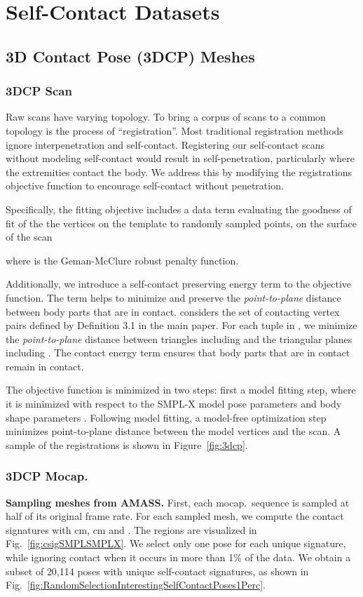 \documentclass[final]{cvpr}
\newcommand{\nummeshes}{20,114}
\theoremstyle{definition}
\begin{document}
\section{Self-Contact Datasets}
\label{sec-registration}
\subsection{3D Contact Pose (3DCP) Meshes}
\subsubsection{3DCP Scan} \label{subsec-3dcpscan}
Raw scans have varying topology.  To bring a corpus of scans to a common topology is the process of ``registration''.
Most traditional registration methods ignore interpenetration and self-contact.
Registering our self-contact scans without modeling self-contact would result in self-penetration, particularly where the extremities contact the body.
We address this by modifying the registrations objective function to encourage self-contact without penetration.

Specifically, the fitting objective includes a data term  evaluating the goodness of fit of the the vertices  on the template   to   randomly sampled points,  on the surface of the scan  

where  is the  Geman-McClure robust penalty function. 

Additionally, we introduce a  self-contact preserving energy term  to the objective function. The term  helps  to minimize and preserve the \emph{point-to-plane} distance between body parts that are in contact.  considers the set of contacting vertex pairs  defined by Definition 3.1 
in the main paper. For each tuple  in , we minimize the \emph{point-to-plane} distance between triangles including  and the triangular planes including  .  The contact energy term ensures that body parts that are in contact remain in contact. 

The objective function is minimized in two steps: first a model fitting step, where it is minimized with respect to the SMPL-X model pose parameters   and body shape parameters . Following model fitting, a model-free optimization step minimizes  point-to-plane distance between the model vertices  and the scan. 
A sample of the  registrations is shown in Figure~\ref{fig:3dcp}.
\subsubsection{3DCP Mocap.} 
\textbf{Sampling meshes from AMASS.} 
First, each mocap.~sequence is sampled at half of its original frame rate. 
For each sampled mesh, we compute the contact signatures  with cm, cm and .
The regions are visualized in Fig.~\ref{fig:csigSMPLSMPLX}.
We select only one pose for each unique signature, while ignoring contact when it occurs in more than 1\% of the data. We obtain a subset of {\nummeshes} poses with unique self-contact signatures, as shown in Fig.~\ref{fig:RandomSelectionInterestingSelfContactPoses1Perc}. 
\end{document}

